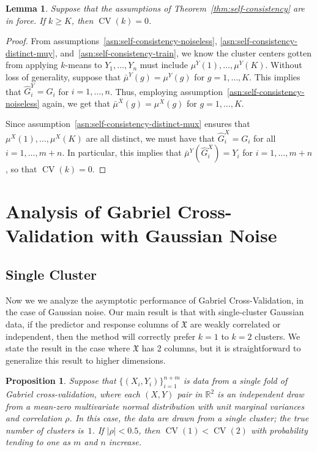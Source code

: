 \documentclass[11pt]{article}
\newtheorem{lemma}{Lemma}
\newtheorem{proposition}{Proposition}
\newcommand{\CV}{\operatorname{CV}}
\newcommand{\R}{\mathbb{R}}
\newcommand{\muX}{\mu^{X}}
\newcommand{\muY}{\mu^{Y}}
\newcommand{\bmuX}{\bar \mu^{X}}
\newcommand{\bmuY}{\bar \mu^{Y}}
\newcommand{\dataX}{\mathfrak{X}}
\newcommand{\hGX}{\hat G^{X}}
\newcommand{\hGY}{\hat G^{Y}}
\begin{document}
\begin{lemma}
Suppose that the assumptions of Theorem~\ref{thm:self-consistency} are in
force.  If $k \geq K$, then $\CV(k) = 0$.
\end{lemma}
\begin{proof}
From assumptions~\ref{asn:self-consistency-noiseless},
\ref{asn:self-consistency-distinct-muy},
and~\ref{asn:self-consistency-train}, we know the cluster centers
gotten from applying $k$-means to $Y_1, \dotsc, Y_n$ must include
$\muY(1), \dotsc, \muY(K)$.  Without loss of generality, suppose that
$\bmuY(g) = \muY(g)$ for $g = 1, \dotsc, K$.  This implies that
$\hGY_i = G_i$ for $i = 1, \dotsc, n$.  Thus, employing
assumption~\ref{asn:self-consistency-noiseless} again, we get that
$\bmuX(g) = \muX(g)$ for $g = 1, \dotsc, K$.


Since assumption~\ref{asn:self-consistency-distinct-mux} ensures that
$\muX(1), \dotsc, \muX(K)$ are all distinct, we must have that $\hGX_i = G_i$
for all $i = 1, \dotsc, m+n$.  In particular, this implies that $\bmuY(\hGX_i)
= Y_i$ for $i = 1, \dotsc, m+n$, so that $\CV(k) = 0$.
\end{proof}



\section{Analysis of Gabriel Cross-Validation with Gaussian Noise}

\subsection{Single Cluster}

Now we we analyze the asymptotic performance of Gabriel Cross-Validation, in
the case of Gaussian noise. Our main result is that with single-cluster
Gaussian data, if the predictor and response columns of $\dataX$ are weakly
correlated or independent, then the method will correctly prefer $k = 1$ to
$k = 2$ clusters. We state the result in the case where $\dataX$ has 2 columns,
but it is straightforward to generalize this result to higher dimensions.

\begin{proposition}
Suppose that $\{ (X_i, Y_i) \}_{i=1}^{n + m}$ is data from a single fold
of Gabriel cross-validation, where each $(X,Y)$ pair in $\R^2$ is an
independent draw from a mean-zero multivariate normal distribution with unit
marginal variances and correlation $\rho$.  In this case, the data are drawn
from a single cluster; the true number of clusters is~$1$.  If $|\rho| < 0.5$,
then $\CV(1) < \CV(2)$ with probability tending to one as $m$ and $n$ increase.
\end{proposition}
\end{document}
